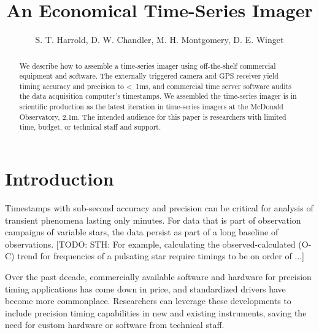 \documentclass[preprint2]{aastex}
\begin{document}
\title{An Economical Time-Series Imager}

\author{
    S. T. Harrold,
    D. W. Chandler,
    M. H. Montgomery,
    D. E. Winget}


\begin{abstract}

We describe how to assemble a time-series imager using off-the-shelf commercial equipment and software. The externally triggered camera and GPS receiver yield timing accuracy and precision to <~1ms, and commercial time server software audits the data acquisition computer's timestamps. We assembled the time-series imager is in scientific production as the latest iteration in time-series imagers at the McDonald Observatory, 2.1m. The intended audience for this paper is researchers with limited time, budget, or technical staff and support.

\end{abstract}



\section{Introduction}

Timestamps with sub-second accuracy and precision can be critical for analysis of transient phenomena lasting only minutes. For data that is part of observation campaigns of variable stars, the data persist as part of a long baseline of observations. [TODO: STH: For example, calculating the observed-calculated (O-C) trend for frequencies of a pulsating star require timings to be on order of ...]

Over the past decade, commercially available software and hardware for precision timing applications has come down in price, and standardized drivers have become more commonplace. Researchers can leverage these developments to include precision timing capabilities in new and existing instruments, saving the need for custom hardware or software from technical staff.
\end{document}
